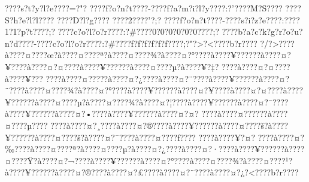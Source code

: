 \documentclass[11pt, openany]{book}
\begin{document}
{{{{{{{{{{{{{{{{{{{{{{{{{{{{{{{{{{{{{{{{{{{{{{{{{{{{{{{{{{{{{{{{{{{{{{{{{{{{{{{{{{{{{{{{{{{{{{{{{{{{{{{{{{{{{???\textbar{}?s?t?y?l?e???\textbar{}?=?"?
???\textbar{}?f?o?n?t???\textbar{}?-???\textbar{}?f?a?m?i?l?y???\textbar{}?:?'???\textbar{}?M?S???\textbar{}?
???\textbar{}?S?h?e?l?l???\textbar{}? ???\textbar{}?D?l?g???\textbar{}?
???\textbar{}?2???\textbar{}?'?;?
???\textbar{}?f?o?n?t???\textbar{}?-???\textbar{}?s?i?z?e???\textbar{}?:???\textbar{}?1?1?p?t???\textbar{}?;?
???\textbar{}?c?o?l?o?r???\textbar{}?:?\#???\textbar{}?0?0?0?0?0?0???\textbar{}?;?
???\textbar{}?b?a?c?k?g?r?o?u?n?d???\textbar{}?-???\textbar{}?c?o?l?o?r???\textbar{}?:?\#???\textbar{}?f?f?f?f?f?f???\textbar{}?;?"?\textgreater{}?\textless{}???\textbar{}?b?r???\textbar{}?
?/?\textgreater{}???\textbar{}?à???\textbar{}?¤???\textbar{}?œ?à???\textbar{}?¤???\textbar{}?ª?à???\textbar{}?¤???\textbar{}?¾?à???\textbar{}?¤?°???\textbar{}?à???\textbar{}?¥?????\textbar{}?à???\textbar{}?¤?¥???\textbar{}?à???\textbar{}?¤?¤???\textbar{}?à???\textbar{}?¥?????\textbar{}?à???\textbar{}?¤???\textbar{}?µ?à???\textbar{}?¥?‡?
???\textbar{}?à???\textbar{}?¤?¤???\textbar{}?à???\textbar{}?¥???
???\textbar{}?à???\textbar{}?¤?­???\textbar{}?à???\textbar{}?¤?¿???\textbar{}?à???\textbar{}?¤?¨???\textbar{}?à???\textbar{}?¥?????\textbar{}?à???\textbar{}?¤?¨???\textbar{}?à???\textbar{}?¤???\textbar{}?¾?à???\textbar{}?¤?°???\textbar{}?à???\textbar{}?¥?????\textbar{}?à???\textbar{}?¤?¥???\textbar{}?à???\textbar{}?¤?¤???\textbar{}?à???\textbar{}?¥?????\textbar{}?à???\textbar{}?¤???\textbar{}?µ?à???\textbar{}?¤???\textbar{}?¾?à???\textbar{}?¤?¦???\textbar{}?à???\textbar{}?¥?????\textbar{}?à???\textbar{}?¤?¯???\textbar{}?à???\textbar{}?¥?????\textbar{}?à???\textbar{}?¤?•???\textbar{}?à???\textbar{}?¥?????\textbar{}?à???\textbar{}?¤?¤?
???\textbar{}?à???\textbar{}?¤?????\textbar{}?à???\textbar{}?¤???\textbar{}?µ???\textbar{}?
???\textbar{}?à???\textbar{}?¤?¸???\textbar{}?à???\textbar{}?¤?®???\textbar{}?à???\textbar{}?¥?????\textbar{}?à???\textbar{}?¤???\textbar{}?š?à???\textbar{}?¥?????\textbar{}?à???\textbar{}?¤???\textbar{}?š?à???\textbar{}?¤?¯???\textbar{}?à???\textbar{}?¤???\textbar{}?ƒ???\textbar{}?
???\textbar{}?à???\textbar{}?¥?¤?
???\textbar{}?à???\textbar{}?¤?‰???\textbar{}?à???\textbar{}?¤???\textbar{}?ª?à???\textbar{}?¤???\textbar{}?µ?à???\textbar{}?¤?¿???\textbar{}?à???\textbar{}?¤?·???\textbar{}?à???\textbar{}?¥?????\textbar{}?à???\textbar{}?¤???\textbar{}?Ÿ?à???\textbar{}?¤?¬???\textbar{}?à???\textbar{}?¥?????\textbar{}?à???\textbar{}?¤?°???\textbar{}?à???\textbar{}?¤???\textbar{}?¾?à???\textbar{}?¤???\textbar{}?¹?à???\textbar{}?¥?????\textbar{}?à???\textbar{}?¤?®???\textbar{}?à???\textbar{}?¤?£???\textbar{}?à???\textbar{}?¤?¨???\textbar{}?à???\textbar{}?¤?¿?\textless{}???\textbar{}?b?r???\textbar{}?
}}}}}}}}}}}}}}}}}}}}}}}}}}}}}}}}}}}}}}}}}}}}}}}}}}}}}}}}}}}}}}}}}}}}}}}}}}}}}}}}}}}}}}}}}}}}}}}}}}}}}}}}}}}}}
\end{document}
